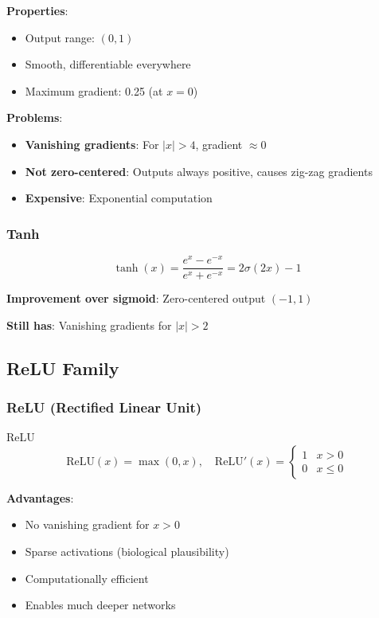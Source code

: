 \textbf{Properties}:
\begin{itemize}
    \item Output range: $(0, 1)$
    \item Smooth, differentiable everywhere
    \item Maximum gradient: 0.25 (at $x=0$)
\end{itemize}

\textbf{Problems}:
\begin{itemize}
    \item \textbf{Vanishing gradients}: For $|x| > 4$, gradient $\approx 0$
    \item \textbf{Not zero-centered}: Outputs always positive, causes zig-zag gradients
    \item \textbf{Expensive}: Exponential computation
\end{itemize}

\subsubsection{Tanh}

\begin{equation}
\tanh(x) = \frac{e^x - e^{-x}}{e^x + e^{-x}} = 2\sigma(2x) - 1
\end{equation}

\textbf{Improvement over sigmoid}: Zero-centered output $(-1, 1)$

\textbf{Still has}: Vanishing gradients for $|x| > 2$

\subsection{ReLU Family}

\subsubsection{ReLU (Rectified Linear Unit)}

\begin{mathresult}{ReLU}
\begin{equation}
\text{ReLU}(x) = \max(0, x), \quad \text{ReLU}'(x) = \begin{cases} 1 & x > 0 \\ 0 & x \leq 0 \end{cases}
\end{equation}
\end{mathresult}

\textbf{Advantages}:
\begin{itemize}
    \item No vanishing gradient for $x > 0$
    \item Sparse activations (biological plausibility)
    \item Computationally efficient
    \item Enables much deeper networks
\end{itemize}

